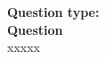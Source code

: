 
\begin{figure}[htb]
    \begin{tcolorbox}
    \textbf{Question type:} \\
    \textbf{Question} \\
    xxxxx
    
    \end{tcolorbox}
    \caption{}
    \label{fig:question-examples}
\end{figure}

